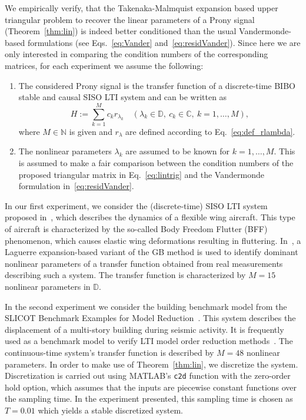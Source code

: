 \documentclass{arxiv}
\begin{document}
We empirically verify, that the Takenaka-Malmquist expansion based upper triangular problem to recover the linear parameters of a Prony signal (Theorem~\ref{thm:lin}) is indeed better conditioned than the usual Vandermonde-based formulations (see Eqs.~\eqref{eq:Vander} and~\eqref{eq:residVander}). Since here we are only interested in comparing the condition numbers of the corresponding matrices, for each experiment we assume the following:
\begin{enumerate}[label = \alph*)]
    \item The considered Prony signal is the transfer function of a discrete-time BIBO stable and causal SISO LTI system and can be written as
    $$
        H := \sum_{k=1}^M c_k r_{\lambda_k} \quad (\lambda_k \in \mathbb{D}, \ c_k \in \mathbb{C}, \ k=1,\ldots,M),
    $$
    where $M \in \mathbb{N}$ is given and $r_\lambda$ are defined according to Eq.~\eqref{eq:def_rlambda}.

    \item The nonlinear parameters $\lambda_k$ are assumed to be known for $k=1,\ldots,M$. This is assumed to make a fair comparison between the condition numbers of the proposed triangular matrix in Eq.~\eqref{eq:lintrig} and the Vandermonde formulation in~\eqref{eq:residVander}. 
\end{enumerate}

In our first experiment, we consider the (discrete-time) SISO LTI system proposed in~\cite{SSSAB}, which describes the dynamics of a flexible wing aircraft. This type of aircraft is characterized by the so-called Body Freedom Flutter (BFF) phenomenon, which causes elastic wing deformations resulting in fluttering. In~\cite{SSSAB}, a Laguerre expansion-based variant of the GB method is used to identify dominant nonlinear parameters of a transfer function obtained from real measurements describing such a system. 
The transfer function is characterized by $M=15$ nonlinear parameters in $\mathbb{D}$. %


In the second experiment we consider the building benchmark model from the SLICOT Benchmark Examples for Model Reduction~\cite{slicot}. This system describes the displacement of a multi-story building during seismic activity. It is frequently used as a benchmark model to verify LTI model order reduction methods~\cite{morAntSG01}. The continuous-time system's transfer function is described by $M=48$ nonlinear parameters. In order to make use of Theorem~\ref{thm:lin}, we discretize the system. Discretization is carried out using MATLAB's \texttt{c2d} function with the zero-order hold option, which assumes that the inputs are piecewise constant functions over the sampling time. In the experiment presented, this sampling time is chosen as $T=0.01$ which yields a stable discretized system. 
\end{document}
